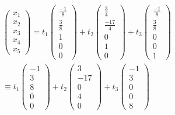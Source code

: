 \documentclass[12pt, a4paper]{article}
\begin{document}
    \begin{multline}
        \begin{pmatrix}
            x_1 \\ x_2 \\ x_3 \\ x_4 \\ x_5
        \end{pmatrix} = 
        t_1 \left(\begin{matrix}
            \frac{-1}{8} \\ \frac{3}{8} \\ 1 \\ 0 \\ 0
        \end{matrix}\right) + 
        t_2 \left(\begin{matrix}
            \frac{3}{4} \\
            \frac{-17}{4} \\
            0 \\
            1 \\
            0
        \end{matrix}\right) + 
        t_3 \left(\begin{matrix}
            \frac{-1}{8} \\
            \frac{3}{8} \\
            0 \\
            0 \\
            1
        \end{matrix}\right)  \\ \equiv t_1 \left(\begin{matrix}
            -1 \\ 3 \\ 8 \\ 0 \\ 0
        \end{matrix}\right) + 
        t_2 \left(\begin{matrix}
            3 \\
            -17 \\
            0 \\
            4 \\
            0
        \end{matrix}\right) + 
        t_3 \left(\begin{matrix}
            -1 \\
            3 \\
            0 \\
            0 \\
            8
        \end{matrix}\right)
    \end{multline}
\end{document}
